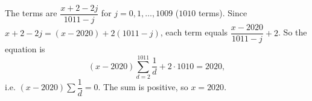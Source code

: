 The terms are $\dfrac{x+2-2j}{1011-j}$ for $j=0,1,\dots,1009$ ($1010$ terms). Since $x+2-2j=(x-2020)+2(1011-j)$, each term equals $\dfrac{x-2020}{1011-j}+2$. So the equation is
\[(x-2020)\sum_{d=2}^{1011}\dfrac1d+2\cdot1010=2020,\]
i.e. $(x-2020)\sum\dfrac1d=0$. The sum is positive, so $x=\boxed{2020}$.
